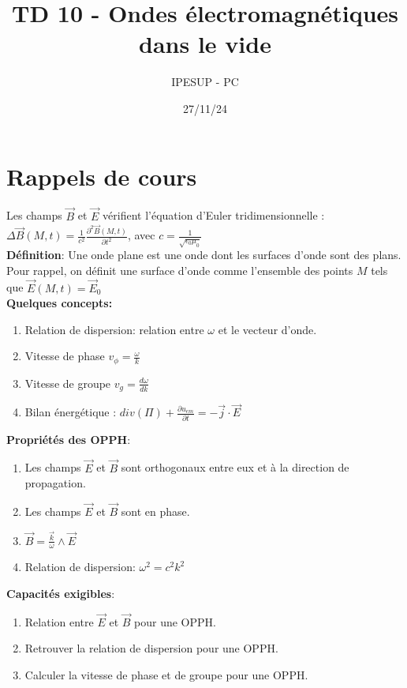 \documentclass{article}
\title{TD 10 - Ondes électromagnétiques dans le vide}
\author{IPESUP - PC }
\date{27/11/24}
\begin{document}
\maketitle

\section{Rappels de cours}

Les champs $\vec{B}$ et $\vec{E}$ vérifient l'équation d'Euler tridimensionnelle : \\

$\Delta \vec{B}(M, t) = \frac{1}{c^2} \frac{\partial^2 \vec{B}(M, t)}{\partial t^2}$, avec $c=\frac{1}{\sqrt{\epsilon_0 \mu_0}}$ \\

\textbf{Définition}: Une onde plane est une onde dont les surfaces d'onde sont des plans. Pour rappel, on définit une surface d'onde comme l'ensemble des points $M$ tels que $\vec{E}(M, t) = \vec{E}_0$  \\

\textbf{Quelques concepts: }
\begin{enumerate}
  \item Relation de dispersion: relation entre $\omega$ et le vecteur d'onde. 
  \item Vitesse de phase $v_\phi = \frac{\omega}{k}$
  \item Vitesse de groupe $v_g = \frac{d\omega}{dk}$
  \item Bilan énergétique : $div(\Pi) + \frac{\partial u_{em}}{\partial t } = -\vec{j} \cdot \vec{E}$     \\[1cm]
\end{enumerate}

\textbf{Propriétés des OPPH}: \\
\begin{enumerate}
  \item Les champs $\vec{E}$ et $\vec{B}$ sont orthogonaux entre eux et à la direction de propagation.
  \item Les champs $\vec{E}$ et $\vec{B}$ sont en phase.
  \item $\vec{B} = \frac{\vec{k}}{\omega} \wedge \vec{E}$
  \item Relation de dispersion: $\omega^2 = c^2 k^2$\\[0.5cm]
\end{enumerate}

\textbf{Capacités exigibles}: \\
\begin{enumerate}
  \item Relation entre $\vec{E}$ et $\vec{B}$ pour une OPPH. 
  \item Retrouver la relation de dispersion pour une OPPH. 
  \item Calculer la vitesse de phase et de groupe pour une OPPH.
\end{enumerate}
\end{document}
